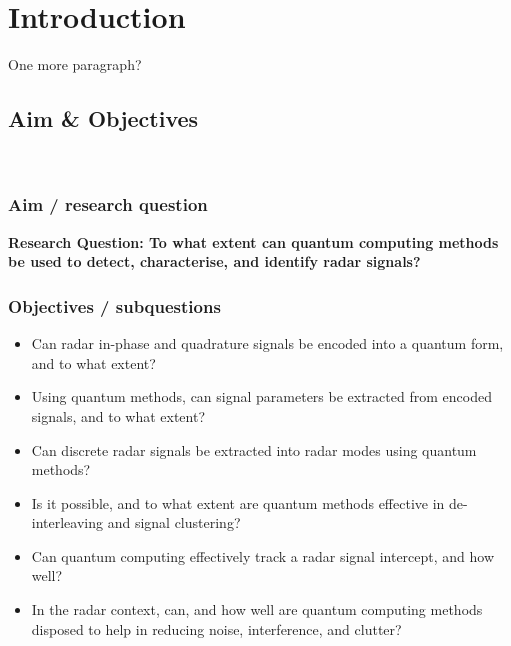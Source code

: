 \section{Introduction}
\label{sec:introduction}
One more paragraph?

\subsection{Aim \& Objectives}~\label{subsec:aims}

\subsubsection{Aim / research question}
\textbf{Research Question: To what extent can quantum computing methods be used to detect, characterise, and identify radar signals?}

\subsubsection{Objectives / subquestions}
\begin{itemize}
    
    \item {}
    Can radar in-phase and quadrature signals be encoded into a quantum form, and to what extent?
    \item Using quantum methods, can signal parameters be extracted from encoded signals, and to what extent?
    \item Can discrete radar signals be extracted into radar modes using quantum methods?
    \item Is it possible, and to what extent are quantum methods effective in de-interleaving and signal clustering?
    \item Can quantum computing effectively track a radar signal intercept, and how well?
    \item {}
    In the radar context, can, and how well are quantum computing methods disposed to help in reducing noise, interference, and clutter?
\end{itemize}


